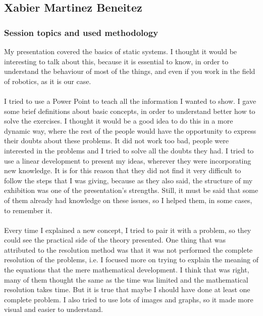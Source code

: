 \subsection{Xabier Martinez Beneitez}
\subsubsection{Session topics and used methodology}
My presentation covered the basics of static systems. I thought it would be interesting to talk about this, because it is 
essential to know, in order to understand the behaviour of most of the things, and even if you work in the field of robotics, as it is our case.\\\\
I tried to use a Power Point to teach all the information I wanted to show. I gave some brief definitions about basic concepts, 
in order to understand better how to solve the exercises. I thought it would be a good idea to do this in a more dynamic way, 
where the rest of the people would have the opportunity to express their doubts about these problems. It did not work too bad, people were interested 
in the problems and I tried to solve all the doubts they had. I tried to use a linear development to present my ideas, wherever they were incorporating 
new knowledge. It is for this reason that they did not find it very difficult to follow the steps that I was giving, because as they also said, the structure
 of my exhibition was one of the presentation's strengths. Still, it must be said that some of them already had knowledge on these issues, so I helped them, in some 
cases, to remember it.\\\\
Every time I explained a new concept, I tried to pair it with a problem, so they could see the practical side of the theory presented. One thing that was 
attributed to the resolution method was that it was not performed the complete resolution of the problems, i.e. I focused more on trying to explain the meaning
of the equations that the mere mathematical development. I think that was right, many of them thought the same as the time was limited and the mathematical 
resolution takes time. But it is true that maybe I should have done at least one complete problem. I also tried to use lots of images and graphs, so it made 
more visual and easier to understand.\\\\
